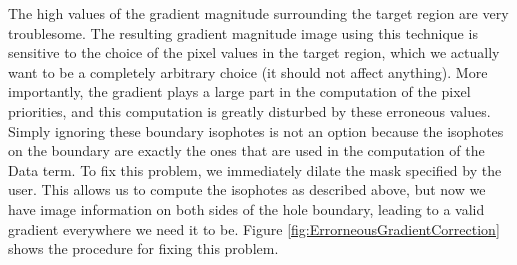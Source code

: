 \documentclass{InsightArticle}
\begin{document}
The high values of the gradient magnitude surrounding the target region are very troublesome. The resulting gradient magnitude image using this technique is sensitive to the choice of the pixel values in the target region, which we actually want to be a completely arbitrary choice (it should not affect anything). More importantly, the gradient plays a large part in the computation of the pixel priorities, and this computation is greatly disturbed by these erroneous values. Simply ignoring these boundary isophotes is not an option because the isophotes on the boundary are exactly the ones that are used in the computation of the Data term. To fix this problem, we immediately dilate the mask specified by the user. This allows us to compute the isophotes as described above, but now we have image information on both sides of the hole boundary, leading to a valid gradient everywhere we need it to be. Figure \ref{fig:ErrorneousGradientCorrection} shows the procedure for fixing this problem.
\end{document}
